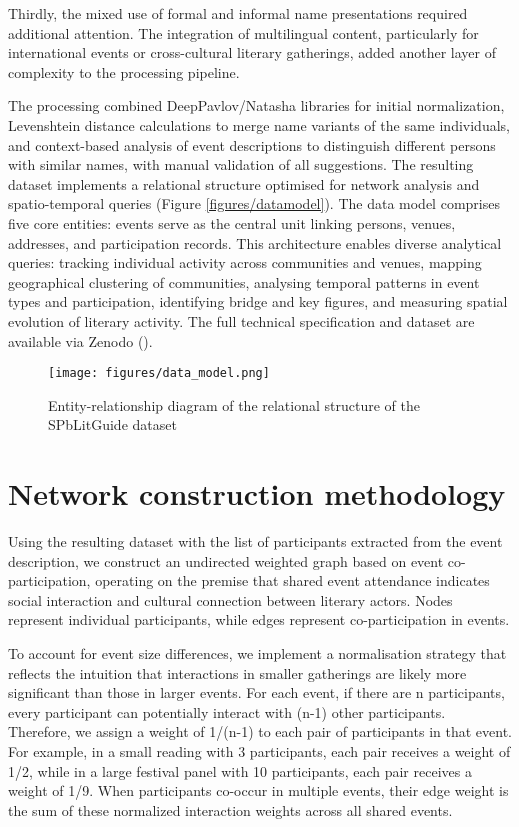 \documentclass{jcls}
\begin{document}
Thirdly, the mixed use of formal and informal name presentations required additional attention. The integration of multilingual content, particularly for international events or cross-cultural literary gatherings, added another layer of complexity to the processing pipeline.

The processing combined DeepPavlov/Natasha libraries for initial normalization, Levenshtein distance calculations to merge name variants of the same individuals, and context-based analysis of event descriptions to distinguish different persons with similar names, with manual validation of all suggestions. The resulting dataset implements a relational structure optimised for network analysis and spatio-temporal queries (Figure \ref{figures/datamodel}). The data model comprises five core entities: events serve as the central unit linking persons, venues, addresses, and participation records. This architecture enables diverse analytical queries: tracking individual activity across communities and venues, mapping geographical clustering of communities, analysing temporal patterns in event types and participation, identifying bridge and key figures, and measuring spatial evolution of literary activity. The full technical specification and dataset are available via Zenodo (\cite{dataset}).

\begin{figure}
	\texttt{[image: figures/data\_model.png]}
	\caption{Entity-relationship diagram of the relational structure of the SPbLitGuide dataset}
    \label{datamodel}
\end{figure}

\section{Network construction methodology}
Using the resulting dataset with the list of participants extracted from the event description, we construct an undirected weighted graph based on event co-participation, operating on the premise that shared event attendance indicates social interaction and cultural connection between literary actors. Nodes represent individual participants, while edges represent co-participation in events. 

To account for event size differences, we implement a normalisation strategy that reflects the intuition that interactions in smaller gatherings are likely more significant than those in larger events. For each event, if there are n participants, every participant can potentially interact with (n-1) other participants. Therefore, we assign a weight of 1/(n-1) to each pair of participants in that event. For example, in a small reading with 3 participants, each pair receives a weight of 1/2, while in a large festival panel with 10 participants, each pair receives a weight of 1/9. When participants co-occur in multiple events, their edge weight is the sum of these normalized interaction weights across all shared events.
\end{document}

